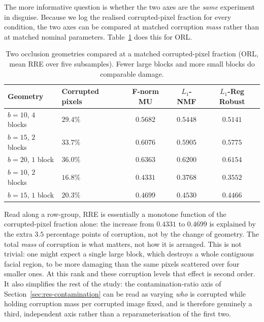 \documentclass[12pt,a4paper]{article}
\begin{document}
The more informative question is whether the two axes are the \emph{same}
experiment in disguise. Because we log the realised corrupted-pixel fraction
for every condition, the two axes can be compared at matched corruption
\emph{mass} rather than at matched nominal parameters. Table~\ref{tab:matched}
does this for ORL.

\begin{table}[tbp]
  \centering
  \caption{Two occlusion geometries compared at a matched corrupted-pixel
           fraction (ORL, mean RRE over five subsamples). Fewer large blocks
           and more small blocks do comparable damage.}
  \label{tab:matched}
  \small
  \begin{tabular}{llccc}
    \toprule
    Geometry & Corrupted pixels & F-norm MU & $L_1$-NMF & $L_1$-Reg Robust \\
    \midrule
    $b=10$, $4$ blocks & $29.4\%$ & $0.5682$ & $0.5448$ & $0.5141$ \\
    $b=15$, $2$ blocks & $33.7\%$ & $0.6076$ & $0.5905$ & $0.5775$ \\
    $b=20$, $1$ block  & $36.0\%$ & $0.6363$ & $0.6200$ & $0.6154$ \\
    \midrule
    $b=10$, $2$ blocks & $16.8\%$ & $0.4331$ & $0.3768$ & $0.3552$ \\
    $b=15$, $1$ block  & $20.3\%$ & $0.4699$ & $0.4530$ & $0.4466$ \\
    \bottomrule
  \end{tabular}
\end{table}

Read along a row-group, RRE is essentially a monotone function of the
corrupted-pixel fraction alone: the increase from $0.4331$ to $0.4699$ is
explained by the extra $3.5$ percentage points of corruption, not by the change
of geometry. The total \emph{mass} of corruption is what matters, not how it is
arranged. This is not trivial: one might expect a single large block, which
destroys a whole contiguous facial region, to be more damaging than the same
pixels scattered over four smaller ones. At this rank and these corruption
levels that effect is second order. It also simplifies the rest of the
study: the contamination-ratio axis of
Section~\ref{sec:res-contamination} can be read as varying \emph{who} is
corrupted while holding corruption mass per corrupted image fixed, and is
therefore genuinely a third, independent axis rather than a reparameterisation
of the first two.
\end{document}
